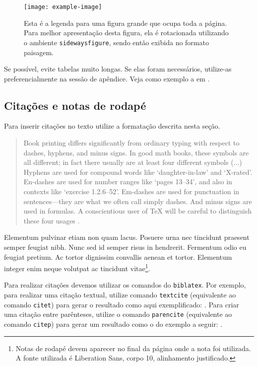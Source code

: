 \documentclass{textolivre}
\begin{document}
\begin{sidewaysfigure}
\centering
\texttt{[image: example-image]}
\caption{Esta é a legenda para uma figura grande que ocupa toda a página. Para melhor apresentação desta figura, ela é rotacionada utilizando o ambiente \texttt{sidewaysfigure}, sendo então exibida no formato paisagem.}
\label{fig:landscape}
\end{sidewaysfigure}


Se possível, evite tabelas muito longas. Se elas foram necessários, utilize-as preferencialmente na sessão de apêndice. 
Veja como exemplo a  em .



\subsection{Citações e notas de rodapé}\label{sec-quotesandfootnotes}
Para inserir citações no texto utilize a formatação descrita nesta seção. 

\begin{quote}
Book printing differs significantly from ordinary typing with respect to dashes, hyphens, and minus signs.
In good math books, these symbols are all different; in fact there usually are at least four different symbols (...)
Hyphens are used for compound words like `daughter-in-law' and `X-rated'. En-dashes are used for number ranges like 
`pages 13--34', and also in contexts like `exercise 1.2.6--52'. 
Em-dashes are used for punctuation in sentences---they are what we often call simply dashes. 
And minus signs are used in formulas. A conscientious user of \TeX{} will be careful to distinguish these four usages 
\cite[p. 4]{donaldknuth1984}.
\end{quote}

Elementum pulvinar etiam non quam lacus. Posuere urna nec tincidunt praesent semper feugiat nibh. 
Nunc sed id semper risus in hendrerit. Fermentum odio eu feugiat pretium. 
Ac tortor dignissim convallis aenean et tortor. 
Elementum integer enim neque volutpat ac tincidunt vitae\footnote{
Notas de rodapé devem aparecer no final da página onde a nota foi utilizada. A fonte utilizada é  Liberation Sans, corpo 10, alinhamento justificado.
}.

Para realizar citações devemos utilizar os comandos do \texttt{biblatex}. Por exemplo, para realizar uma
citação textual, utilize comando \texttt{textcite} (equivalente ao comando \texttt{citet}) para gerar o
resultado como aqui exemplificado: \textcite{donaldknuth1984}. 
Para criar uma citação entre parênteses, utilize o comando \texttt{parencite} (equivalente ao comando \texttt{citep})
para gerar um resultado como o do exemplo a seguir: \parencite{donaldknuth1984}.
\end{document}
